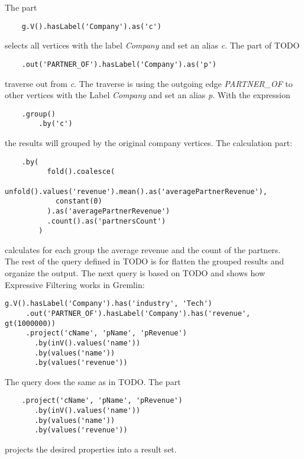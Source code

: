 The part 
\begin{lstlisting}
	g.V().hasLabel('Company').as('c')
\end{lstlisting}
selects all vertices with the label \textit{Company} and set an alias \textit{c}.
The part of TODO
\begin{lstlisting}
	.out('PARTNER_OF').hasLabel('Company').as('p')
\end{lstlisting} traverse out from \textit{c}.
The traverse is using the outgoing edge \textit{PARTNER\_OF} to other vertices with 
the Label \textit{Company} and set an alias \textit{p}. \newline With the expression
\begin{lstlisting}
	.group()
	    .by('c')
\end{lstlisting}
the results will grouped by the original company vertices.
The calculation part:
\begin{lstlisting}
	.by(
	      fold().coalesce(
	        unfold().values('revenue').mean().as('averagePartnerRevenue'),
	        constant(0)
	      ).as('averagePartnerRevenue')
	      .count().as('partnersCount')
	    )
\end{lstlisting}
calculates for each group the average revenue and the count of the partners.\\
The rest of the query defined in TODO is for flatten the grouped results and 
organize the output.
The next query is based on TODO and shows how Expressive Filtering works in Gremlin:
\begin{lstlisting}[caption={Expressive Filtering in Gremlin with Company Nodes}, label={lst:companyExpressiveFilteringGremlin}]
	g.V().hasLabel('Company').has('industry', 'Tech')
	 .out('PARTNER_OF').hasLabel('Company').has('revenue', gt(1000000))
	 .project('cName', 'pName', 'pRevenue')
	   .by(inV().values('name'))
	   .by(values('name'))
	   .by(values('revenue'))
\end{lstlisting}
The query does the same as in TODO. The part
\begin{lstlisting}
	.project('cName', 'pName', 'pRevenue')
	   .by(inV().values('name'))
	   .by(values('name'))
	   .by(values('revenue'))
\end{lstlisting} 
projects the desired properties into a result set.

